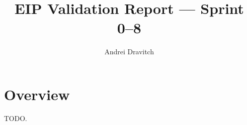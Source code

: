 \documentclass{article}
\title{EIP Validation Report — Sprint 0–8}
\author{Andrei Dravitch}
\date{}
\begin{document}
\maketitle

\section{Overview}
TODO.
\end{document}
